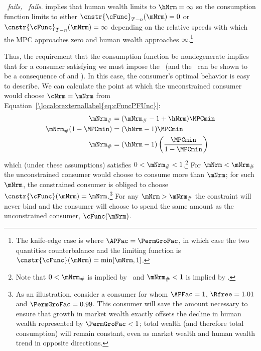 \documentclass[\econtexRoot/BufferStockTheory]{subfiles}
\begin{document}
\hypertarget{cnclGICRawcnclRICcnclFHWC}{}

\textit{{\RIC}~fails, {\FHWC}~fails}. {\cncl{\FHWC}} implies that human wealth limits to $\hNrm =
\infty$ so the consumption function limits to either
$\cnstr{\cFunc}_{T-n}(\mNrm) = 0$ or
$\cnstr{\cFunc}_{T-n}(\mNrm) = \infty$ depending on the relative
speeds with which the MPC approaches zero and human wealth approaches
$\infty$.\footnote{The knife-edge case is where $\APFac = \PermGroFac$, in
  which case the two quantities counterbalance and the limiting
  function is $\cnstr{\cFunc}(\mNrm)=\min[\mNrm,1]$.}

\let\TableWidth\relax
{\newlength\TableWidth}

Thus, the requirement that the consumption function be nondegenerate
implies that for a consumer satisfying \cncl{\GICRaw} we must impose
the \RIC~(and the \FHWC~can be shown to be a consequence of \cncl{\GICRaw} and \RIC).  In
this case, the consumer's optimal behavior is easy to describe.  We
can calculate the point at which the unconstrained consumer would
choose $\cNrm = \mNrm$ from Equation~\eqref{\localorexternallabel{eq:cFuncPFUnc}}:
\begin{equation}\begin{gathered}\begin{aligned}
  \mNrm_{\#}  & = (\mNrm_{\#}-1+\hNrm)\MPCmin
  \\ \mNrm_{\#}(1-\MPCmin)  & = (\hNrm - 1)\MPCmin
  \\ \mNrm_{\#}  & = (\hNrm - 1)\left(\frac{\MPCmin}{1-\MPCmin}\right)
\end{aligned}\end{gathered}\end{equation}
which (under these assumptions) satisfies $0 < \mNrm_{\#} < 1$.\footnote{Note that $0 < \mNrm_{\#}$ is implied by \RIC~and $ \mNrm_{\#}<1$ is implied by \cncl{\GICRaw}.}  For
$\mNrm < \mNrm_{\#}$ the unconstrained consumer would choose to
consume more than $\mNrm$; for such $\mNrm$, the constrained consumer
is obliged to choose $\cnstr{\cFunc}(\mNrm) = \mNrm$.\footnote{As an
  illustration, consider a consumer for whom $\APFac = 1$, $\Rfree
  =1.01$ and $\PermGroFac = 0.99$.  This consumer will save the amount
  necessary to ensure that growth in market wealth exactly offsets the
  decline in human wealth represented by $\PermGroFac < 1$; total wealth
  (and therefore total consumption) will remain constant, even as
  market wealth and human wealth trend in opposite directions.}  For
any $\mNrm > \mNrm_{\#}$ the constraint will never bind and the
consumer will choose to spend the same amount as the unconstrained
consumer, $\bar{\cFunc}(\mNrm)$.
\end{document}
